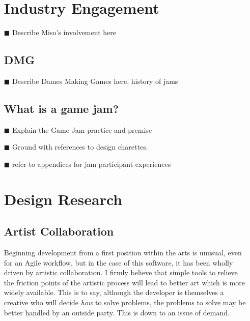 \begin{itemize}
\section{Industry Engagement}

\item[\tiny{$\blacksquare$}] Describe Miso's involvement here

\subsection{DMG}

\item[\tiny{$\blacksquare$}] Describe Dames Making Games here, history of jams


\subsection{What is a game jam?}

\item[\tiny{$\blacksquare$}] Explain the Game Jam practice and premise
\item[\tiny{$\blacksquare$}] Ground with references to design charettes.
\item[\tiny{$\blacksquare$}] refer to appendices for jam participant experiences

\section{Design Research}

\subsection{Artist Collaboration}

Beginning development from a first position within the arts is unusual, even for an Agile workflow, but in the case of this software, it has been wholly driven by artistic collaboration. I firmly believe that simple tools to relieve the friction points of the artistic process will lead to better art which is more widely available. This is to say, although the developer is themselves a creative who will decide \textit{how} to solve problems, the problems to solve may be better handled by an outside party. This is down to an issue of demand. 


\end{itemize}

